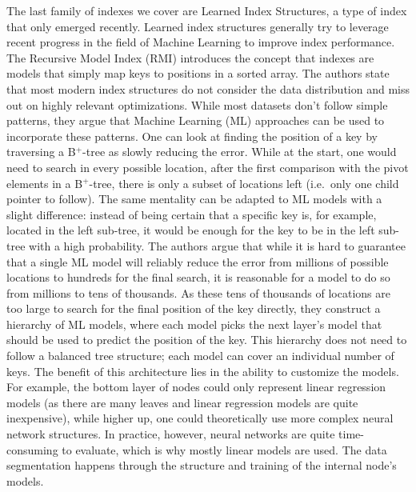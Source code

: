 The last family of indexes we cover are Learned Index Structures, a type of index that only emerged recently. Learned index structures generally try to leverage recent progress in the field of Machine Learning to improve index performance. The Recursive Model Index (RMI) \cite{Kraska2018} introduces the concept that indexes are models that simply map keys to positions in a sorted array. The authors state that most modern index structures do not consider the data distribution and miss out on highly relevant optimizations. While most datasets don't follow simple patterns, they argue that Machine Learning (ML) approaches can be used to incorporate these patterns. One can look at finding the position of a key by traversing a B$^+$-tree as slowly reducing the error. While at the start, one would need to search in every possible location, after the first comparison with the pivot elements in a B$^+$-tree, there is only a subset of locations left (i.e.~only one child pointer to follow). The same mentality can be adapted to ML models with a slight difference: instead of being certain that a specific key is, for example, located in the left sub-tree, it would be enough for the key to be in the left sub-tree with a high probability. The authors argue that while it is hard to guarantee that a single ML model will reliably reduce the error from millions of possible locations to hundreds for the final search, it is reasonable for a model to do so from millions to tens of thousands. As these tens of thousands of locations are too large to search for the final position of the key directly, they construct a hierarchy of ML models, where each model picks the next layer's model that should be used to predict the position of the key. This hierarchy does not need to follow a balanced tree structure; each model can cover an individual number of keys. The benefit of this architecture lies in the ability to customize the models. For example, the bottom layer of nodes could only represent linear regression models (as there are many leaves and linear regression models are quite inexpensive), while higher up, one could theoretically use more complex neural network structures. In practice, however, neural networks are quite  time-consuming to evaluate, which is why mostly linear models are used. The data segmentation happens through the structure and training of the internal node's models. 

